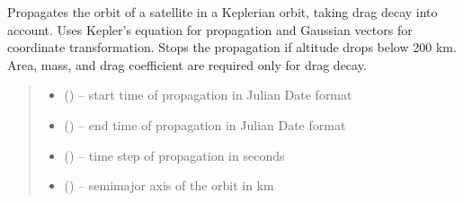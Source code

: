 \documentclass[letterpaper,10pt,english]{sphinxmanual}
\begin{document}

\begin{fulllineitems}
\label{\detokenize{fspsim.utils:fspsim.utils.Propagators.kepler_prop}}
\pysigstartsignatures
{}
\pysigstopsignatures
\sphinxAtStartPar
Propagates the orbit of a satellite in a Keplerian orbit, taking drag decay into account.
Uses Kepler’s equation for propagation and Gaussian vectors for coordinate transformation.
Stops the propagation if altitude drops below 200 km.
Area, mass, and drag coefficient are required only for drag decay.
\begin{quote}\begin{description}
\begin{itemize}
\item {} 
\sphinxAtStartPar
{} () – start time of propagation in Julian Date format

\item {} 
\sphinxAtStartPar
{} () – end time of propagation in Julian Date format

\item {} 
\sphinxAtStartPar
{} () – time step of propagation in seconds

\item {} 
\sphinxAtStartPar
{} () – semi\sphinxhyphen{}major axis of the orbit in km


\end{itemize}
\end{description}
\end{quote}
\end{fulllineitems}
\end{document}
